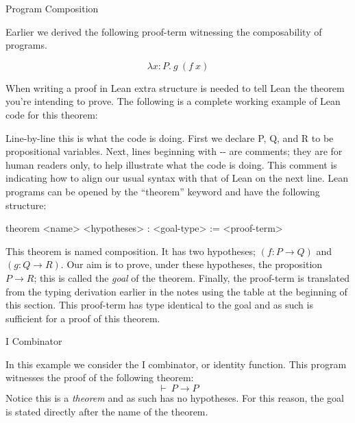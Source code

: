 \documentclass{book}
\begin{document}
    \begin{eg}{Program Composition}

        Earlier we derived the following proof-term witnessing the composability of programs.

        $$ \lambda x : P. \ g \ (f \ x) $$

        When writing a proof in Lean extra structure is needed to tell Lean the theorem you're intending to prove. The following is a complete working example of Lean code for this theorem: 

%    
    
        Line-by-line this is what the code is doing. First we declare P, Q, and R to be propositional variables. Next, lines beginning with -{}- are comments; they are for human readers only, to help illustrate what the code is doing. This comment is indicating how to align our usual syntax with that of Lean on the next line. Lean programs can be opened by the ``theorem'' keyword and have the following structure:
        
        \begin{center}
            theorem <name> <hypotheses> : <goal-type> := 
                <proof-term>
        \end{center}

        This theorem is named composition. It has two hypotheses; $(f : P \to Q)$ and $(g : Q \to R)$. Our aim is to prove, under these hypotheses, the proposition $P \to R$; this is called the \emph{goal} of the theorem. Finally, the proof-term is translated from the typing derivation earlier in the notes using the table at the beginning of this section. This proof-term has type identical to the goal and as such is sufficient for a proof of this theorem. 
    \end{eg}

    \begin{eg}{I Combinator}

        In this example we consider the I combinator, or identity function. This program witnesses the proof of the following theorem: $$ \vdash \ P \to P$$
        Notice this is a \emph{theorem} and as such has no hypotheses. For this reason, the goal is stated directly after the name of the theorem.
%
%            
        
    \end{eg}
\end{document}
